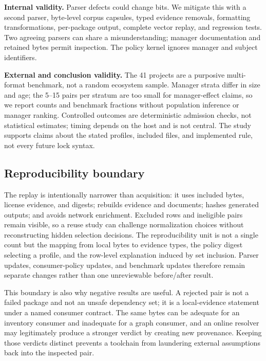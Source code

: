 \documentclass[10pt,conference]{IEEEtran}
\begin{document}
\textbf{Internal validity.} Parser defects could change bits. We mitigate this with a second parser, byte-level corpus capsules, typed evidence removals, formatting transformations, per-package output, complete vector replay, and regression tests. Two agreeing parsers can share a misunderstanding; manager documentation and retained bytes permit inspection. The policy kernel ignores manager and subject identifiers.

\textbf{External and conclusion validity.} The 41 projects are a purposive multi-format benchmark, not a random ecosystem sample. Manager strata differ in size and age; the 5--15 pairs per stratum are too small for manager-effect claims, so we report counts and benchmark fractions without population inference or manager ranking. Controlled outcomes are deterministic admission checks, not statistical estimates; timing depends on the host and is not central. The study supports claims about the stated profiles, included files, and implemented rule, not every future lock syntax.


\subsection{Reproducibility boundary}
The replay is intentionally narrower than acquisition: it uses included bytes, license evidence, and digests; rebuilds evidence and documents; hashes generated outputs; and avoids network enrichment. Excluded rows and ineligible pairs remain visible, so a reuse study can challenge normalization choices without reconstructing hidden selection decisions. The reproducibility unit is not a single count but the mapping from local bytes to evidence types, the policy digest selecting a profile, and the row-level explanation induced by set inclusion. Parser updates, consumer-policy updates, and benchmark updates therefore remain separate changes rather than one unreviewable before/after result.

This boundary is also why negative results are useful. A rejected pair is not a failed package and not an unsafe dependency set; it is a local-evidence statement under a named consumer contract. The same bytes can be adequate for an inventory consumer and inadequate for a graph consumer, and an online resolver may legitimately produce a stronger verdict by creating new provenance. Keeping those verdicts distinct prevents a toolchain from laundering external assumptions back into the inspected pair.
\end{document}
